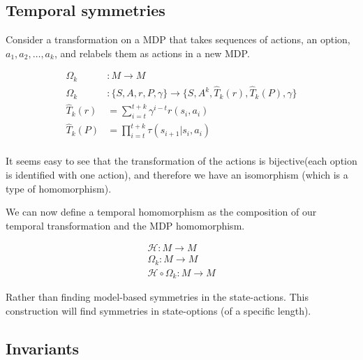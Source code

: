 \subsection{Temporal symmetries}

Consider a transformation on a MDP that takes sequences of actions, an option, $a_1, a_2, \dots, a_k$, and relabels them as actions in a new MDP.

\begin{align*}
\Omega_k&: M \to M \\
\Omega_k&:\{S, A, r, P, \gamma\} \to \{S, A^k, \hat T_k(r), \hat T_k(P), \gamma\} \\
\hat T_k(r) &= \sum_{i=t}^{t+k} \gamma^{i-t} r(s_i, a_i) \\
\hat T_k(P) &= \prod_{i=t}^{t+k} \tau(s_{i+1} | s_i, a_i) \\
\end{align*}

It seems easy to see that the transformation of the actions is bijective\footnotemark (each option is identified with one action), and therefore we have an isomorphism (which is a type of homomorphism).




We can now define a temporal homomorphism as the composition of our temporal transformation and the MDP homomorphism.

\begin{align*}
\mathcal H: M \to M \tag{MDP homomorphism}\\
\Omega_k: M \to M \tag{temporal transformation}\\
\mathcal H\circ \Omega_k : M \to M \tag{temporal homomorphism}
\end{align*}

Rather than finding model-based symmetries in the state-actions. This construction will find symmetries
in state-options (of a specific length).

\subsection{Invariants}\label{game-invariants}

